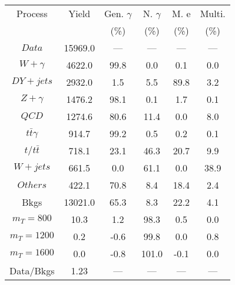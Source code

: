 \begin{figure}
\begin{minipage}[c]{0.32\textwidth}
{\begin{tabular}{cccccc}
\hline
Process & Yield & Gen. $\gamma$ & N. $\gamma$ & M. e & Multi. \\
 &  & (\%) & (\%) & (\%) & (\%)  \\
\hline
                                                                      $ Data $ &  15969.0 &  --- &  --- &  --- &  ---\\
$ W+\gamma $ &  4622.0 &  99.8 &  0.0 &  0.1 &  0.0\\
$ DY+jets $ &  2932.0 &  1.5 &  5.5 &  89.8 &  3.2\\
$ Z+\gamma $ &  1476.2 &  98.1 &  0.1 &  1.7 &  0.1\\
$ QCD $ &  1274.6 &  80.6 &  11.4 &  0.0 &  8.0\\
$ t\bar{t}\gamma $ &  914.7 &  99.2 &  0.5 &  0.2 &  0.1\\
$ t/t\bar{t} $ &  718.1 &  23.1 &  46.3 &  20.7 &  9.9\\
$ W+jets $ &  661.5 &  0.0 &  61.1 &  0.0 &  38.9\\
$ Others $ &  422.1 &  70.8 &  8.4 &  18.4 &  2.4\\
Bkgs &  13021.0 &  65.3 &  8.3 &  22.2 &  4.1\\
$ m_{T} = 800 $ &  10.3 &  1.2 &  98.3 &  0.5 &  0.0\\
$ m_{T} = 1200 $ &  0.2 &  -0.6 &  99.8 &  0.0 &  0.8\\
$ m_{T} = 1600 $ &  0.0 &  -0.8 &  101.0 &  -0.1 &  0.0\\
Data/Bkgs &  1.23 &  --- &  --- &  --- &  ---\\
\hline
\end{tabular}
}
\end{minipage}
\end{figure}


